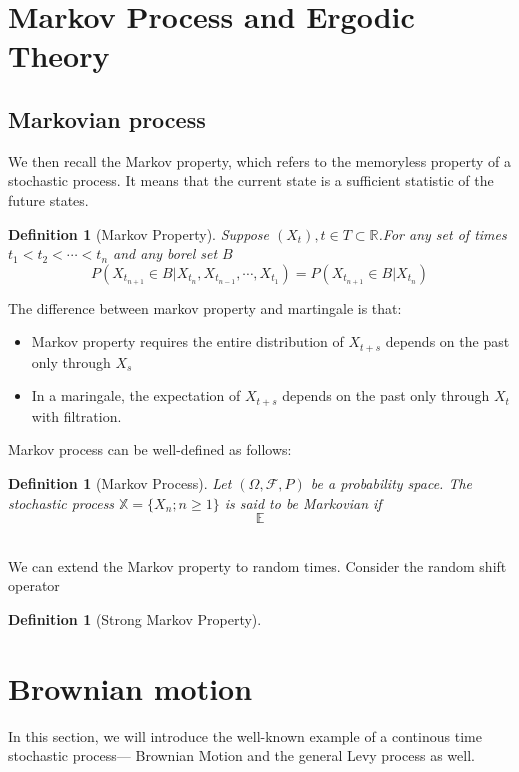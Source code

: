 \documentclass[11pt,english]{smfart}
\newtheorem{definition}[theorem]{Definition}
\begin{document}
\newpage
\section{Markov Process and Ergodic Theory}

\subsection{Markovian process} We then recall the Markov property, which refers to the memoryless property of a stochastic process. It means that the current state is a sufficient statistic of the future states.
~\\
\begin{definition}[Markov Property]
    Suppose $(X_t),t\in T \subset \mathbb{R}$.For any set of times $t_1 < t_2<\cdots <t_n$ and any borel set $B$
    $$ P(X_{t_{n+1}}\in B | X_{t_n}, X_{t_{n-1}},\cdots,X_{t_1}) = P(X_{t_{n+1}}\in B | X_{t_n})$$
\end{definition} 

The difference between markov property and martingale is that:
\begin{itemize}
    \item Markov property requires the entire distribution of $X_{t+s}$ depends on the past only through $X_s$
    \item In a maringale, the expectation of $X_{t+s}$ depends on the past only through $X_t$ with filtration.
\end{itemize}
Markov process can be well-defined as follows:
~\\
\begin{definition}[Markov Process]
    Let $(\Omega,\mathcal{F},P)$ be a probability space. The stochastic process $\mathbb{X} = \{X_n; n \geq 1\}$ is said to be Markovian if $$\mathbb{E}$$
\end{definition}
~\\

We can extend the Markov property to random times. Consider the random shift operator 

\begin{definition}[Strong Markov Property]

\end{definition}

\newpage
\section{Brownian motion}
In this section, we will introduce the well-known example of a continous time stochastic process--- Brownian Motion and the general Levy process as well.
\end{document}

